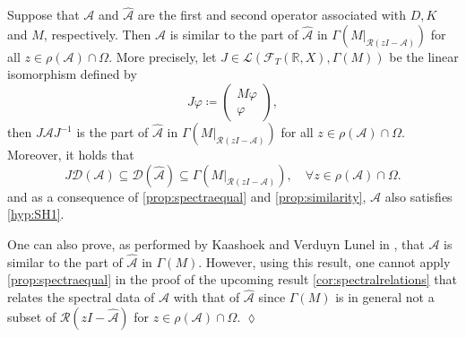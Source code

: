 \documentclass[english]{myarticle}
\begin{document}
\begin{sloppypar}
\begin{lemma} \label{lemma:graphJ}
Suppose that $\mathcal{A}$ and $\hat{\mathcal{A}}$ are the first and second operator associated with $D,K$ and $M$, respectively. Then $\mathcal{A}$ is similar to the part of $\hat{\mathcal{A}}$ in $\Gamma(M|_{\mathcal{R}(zI-\mathcal{A})})$ for all $z \in \rho(\mathcal{A}) \cap \Omega$. More precisely, let $J \in \mathcal{L}(\mathcal{F}_T(\mathbb{R}, X),\Gamma(M))$ be the linear isomorphism defined by 
\begin{equation} \label{eq:defJ}
    J \varphi  \coloneqq \begin{pmatrix}
    M \varphi \\
    \varphi
\end{pmatrix},
\end{equation}
then $J \mathcal{A} J^{-1}$ is the part of $\hat{\mathcal{A}}$ in $\Gamma(M|_{\mathcal{R}(zI-\mathcal{A})})$ for all $z \in \rho(\mathcal{A}) \cap \Omega$. Moreover, it holds that 
\begin{equation} \label{eq:JDAinclusion}
    J \mathcal{D}(\mathcal{A}) \subseteq \mathcal{D}(\hat{\mathcal{A}}) \subseteq \Gamma(M|_{\mathcal{R}(zI-\mathcal{A})}), \quad \forall z \in \rho(\mathcal{A}) \cap \Omega.
\end{equation}
and as a consequence of \cref{prop:spectraequal} and \cref{prop:similarity}, $\hat{\mathcal{A}}$ also satisfies \ref{hyp:SH1}.
\end{lemma}

\begin{remark}
One can also prove, as performed by Kaashoek and Verduyn Lunel in \cite[Lemma 3.3]{Kaashoek1992}, that $\mathcal{A}$ is similar to the part of $\hat{\mathcal{A}}$ in $\Gamma(M)$. However, using this result, one cannot apply \cref{prop:spectraequal} in the proof of the upcoming result \cref{cor:spectralrelations} that relates the spectral data of $\mathcal{A}$ with that of $\hat{\mathcal{A}}$ since $\Gamma(M)$ is in general not a subset of $\mathcal{R}(zI- \hat{\mathcal{A}})$ for $z \in \rho(\mathcal{A}) \cap \Omega$. \hfill $\lozenge$
\end{remark}


\end{sloppypar}
\end{document}
